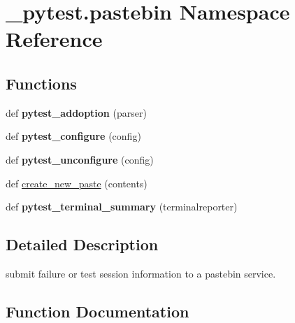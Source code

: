 \hypertarget{namespace__pytest_1_1pastebin}{}\section{\+\_\+pytest.\+pastebin Namespace Reference}
\label{namespace__pytest_1_1pastebin}
\subsection*{Functions}
\begin{DoxyCompactItemize}
\item 
\mbox{\label{namespace__pytest_1_1pastebin_aee4b87140d3cb263cb4a46c5a5f64ce7}} 
def {\bfseries pytest\+\_\+addoption} (parser)
\item 
\mbox{\label{namespace__pytest_1_1pastebin_a884b203c1edc2b69153cdd97cc668300}} 
def {\bfseries pytest\+\_\+configure} (config)
\item 
\mbox{\label{namespace__pytest_1_1pastebin_aa1dc471234ce167fbd4407012c18578b}} 
def {\bfseries pytest\+\_\+unconfigure} (config)
\item 
def \hyperlink{namespace__pytest_1_1pastebin_aefc3807f9783b333099838fb9cb96c31}{create\+\_\+new\+\_\+paste} (contents)
\item 
\mbox{\label{namespace__pytest_1_1pastebin_a2a546c7bd421d1731807625eae5584e3}} 
def {\bfseries pytest\+\_\+terminal\+\_\+summary} (terminalreporter)
\end{DoxyCompactItemize}


\subsection{Detailed Description}
\begin{DoxyVerb}submit failure or test session information to a pastebin service. \end{DoxyVerb}
 

\subsection{Function Documentation}
\mbox{\label{namespace__pytest_1_1pastebin_aefc3807f9783b333099838fb9cb96c31}} 
